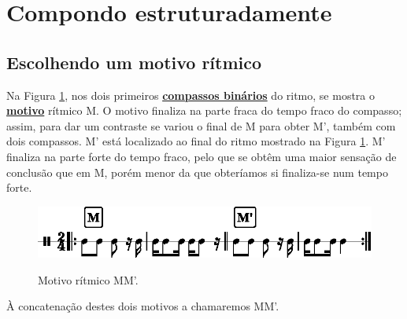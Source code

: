 
\section{Compondo estruturadamente}
\label{sec:compondoestruturadamente}


\subsection{Escolhendo um motivo rítmico}
Na Figura \ref{fig:motivoritmico1}, 
nos  dois  primeiros \hyperref[subsec:compassobinario]{\textbf{compassos binários}} do ritmo,
 se mostra o  \hyperref[sec:Motivo]{\textbf{motivo}} rítmico M. 
O motivo finaliza na parte fraca do tempo fraco do compasso; assim,
para dar um contraste se variou o final de M para obter M', 
também com dois compassos. M' está localizado ao final do ritmo mostrado na Figura \ref{fig:motivoritmico1}. 
M' finaliza na parte forte do tempo fraco, pelo que se obtêm uma maior sensação de conclusão que em M, 
porém menor da que obteríamos si finaliza-se num tempo forte.
\begin{figure}[H]
     \centering
     \href{https://drive.google.com/file/d/1cswgo6-Sjtg_bXyf1Ck3OcJpVPo_KJEq/view?usp=sharing}{\includegraphics[width=\textwidth]{chapters/cap-musica-topicos/motivo-ritmico-1.eps}}
     \caption{Motivo rítmico MM'.}
     \label{fig:motivoritmico1}
\end{figure}
À concatenação destes dois motivos a chamaremos MM'.


